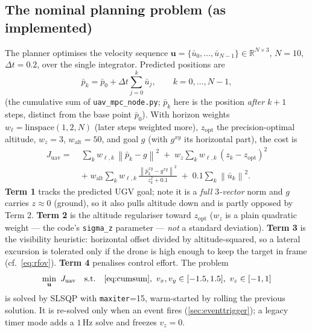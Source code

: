 \documentclass[11pt]{article}
\newcommand{\R}{\mathbb{R}}
\newcommand{\norm}[1]{\left\lVert #1 \right\rVert}
\newcommand{\bu}{\bar{u}}
\newcommand{\bp}{\bar{p}}
\newcommand{\code}[1]{\texttt{#1}}
\newcommand{\opt}{\mathrm{opt}}
\begin{document}
\subsection{The nominal planning problem (as implemented)}
The planner optimises the velocity sequence $\mathbf{u}=\{\bu_0,\dots,\bu_{N-1}\}\in\R^{N\times3}$, $N=10$,
$\Delta t=0.2$, over the single integrator. Predicted positions are
\begin{equation}
\bp_k = \bp_0 + \Delta t\sum_{j=0}^{k}\bu_j ,\qquad k=0,\dots,N-1,
\label{eq:cumsum}
\end{equation}
(the cumulative sum of \code{uav\_mpc\_node.py}; $\bp_k$ here is the position \emph{after} $k{+}1$ steps,
distinct from the base point $\bp_0$). With horizon weights
$w_\ell=\mathrm{linspace}(1,2,N)$ (later steps weighted more), $z_\opt$ the precision-optimal altitude,
$w_z=3$, $w_{\text{alt}}=50$, and goal $g$ (with $g^{xy}$ its horizontal part), the cost is
\begin{equation}
\boxed{\;
\begin{aligned}
J_{\text{uav}} =\; & \sum_{k} w_{\ell,k}\,\norm{\bp_k-g}^2
\;+\; w_z\sum_{k} w_{\ell,k}\,(z_k-z_\opt)^2 \\
&+\; w_{\text{alt}}\sum_{k} w_{\ell,k}\,\frac{\norm{\bp^{xy}_k-g^{xy}}^2}{z_k^2+0.1}
\;+\; 0.1\sum_{k}\norm{\bu_k}^2 .
\end{aligned}\;}
\label{eq:uavcost}
\end{equation}
\textbf{Term 1} tracks the predicted UGV goal; note it is a \emph{full $3$-vector} norm and $g$ carries
$z\approx0$ (ground), so it also pulls altitude down and is partly opposed by Term 2. \textbf{Term 2} is the
altitude regulariser toward $z_\opt$ ($w_z$ is a plain quadratic weight --- the code's \code{sigma\_z}
parameter --- \emph{not} a standard deviation). \textbf{Term 3} is the visibility heuristic: horizontal offset
divided by altitude-squared, so a lateral excursion is tolerated only if the drone is high enough to keep the
target in frame (cf.\ \cref{eq:rfov}). \textbf{Term 4} penalises control effort. The problem
\[
\min_{\mathbf{u}}\ J_{\text{uav}}\quad
\text{s.t.}\quad \cref{eq:cumsum},\ v_x,v_y\in[-1.5,1.5],\ v_z\in[-1,1]
\]
is solved by SLSQP \citep{nocedal2006numerical} with \code{maxiter}=15, warm-started by rolling the previous
solution. It is re-solved only when an event fires (\cref{sec:eventtrigger}); a legacy timer mode adds a
$1$\,Hz solve and freezes $v_z=0$.
\end{document}

